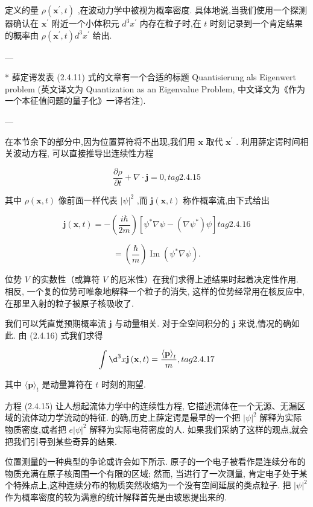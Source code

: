 \documentclass[lang=cn,newtx,10pt,scheme=chinese,thmcnt=section]{elegantbook}
\begin{document}
定义的量 $\rho \left( {{\mathbf{x}}^{\prime }, t}\right)$ ,在波动力学中被视为概率密度. 具体地说,当我们使用一个探测器确认在 ${\mathbf{x}}^{\prime }$ 附近一个小体积元 ${d}^{3}{x}^{\prime }$ 内存在粒子时,在 $t$ 时刻记录到一个肯定结果的概率由 $\rho \left( {{\mathbf{x}}^{\prime }, t}\right) {d}^{3}{x}^{\prime }$ 给出.

---

* 薛定谔发表 (2.4.11) 式的文章有一个合适的标题 Quantisierung als Eigenwert problem (英文译文为 Quantization as an Eigenvalue Problem, 中文译文为《作为一个本征值问题的量子化》一译者注).

---

在本节余下的部分中,因为位置算符将不出现,我们用 $\mathbf{x}$ 取代 ${\mathbf{x}}^{\prime }$ . 利用薛定谔时间相关波动方程, 可以直接推导出连续性方程

$$
\frac{\partial \rho }{\partial t} + \nabla \cdot \mathbf{j} = 0, tag{2.4.15}
$$

其中 $\rho \left( {\mathbf{x}, t}\right)$ 像前面一样代表 ${\left| \psi \right| }^{2}$ ,而 $\mathbf{j}\left( {\mathbf{x}, t}\right)$ 称作概率流,由下式给出

$$
\mathbf{j}\left( {\mathbf{x}, t}\right) = - \left( \frac{i\hbar }{2m}\right) \left\lbrack {{\psi }^{ * }\nabla \psi - \left( {\nabla {\psi }^{ * }}\right) \psi }\right\rbrack tag{2. 4.16}
$$

$$
= \left( \frac{\hbar }{m}\right) \operatorname{Im}\left( {{\psi }^{ * }\nabla \psi }\right) .
$$

位势 $V$ 的实数性（或算符 $V$ 的厄米性）在我们求得上述结果时起着决定性作用. 相反, 一个复的位势可唯象地解释一个粒子的消失, 这样的位势经常用在核反应中, 在那里入射的粒子被原子核吸收了.

我们可以凭直觉预期概率流 $\mathbf{j}$ 与动量相关. 对于全空间积分的 $\mathbf{j}$ 来说,情况的确如此. 由 (2.4.16) 式我们求得

$$
\int {\d}^{3}x\mathbf{j}\left( {\mathbf{x}, t}\right) = \frac{\langle \mathbf{p}{\rangle }_{t}}{m}, tag{2.4.17}
$$

其中 $\langle \mathbf{p}{\rangle }_{t}$ 是动量算符在 $t$ 时刻的期望.

方程 (2.4.15) 让人想起流体力学中的连续性方程, 它描述流体在一个无源、无漏区域的流体动力学流动的特征. 的确,历史上薛定谔是最早的一个把 ${\left| \psi \right| }^{2}$ 解释为实际物质密度,或者把 $e{\left| \psi \right| }^{2}$ 解释为实际电荷密度的人. 如果我们采纳了这样的观点,就会把我们引导到某些奇异的结果.

位置测量的一种典型的争论或许会如下所示. 原子的一个电子被看作是连续分布的物质充满在原子核周围一个有限的区域; 然而, 当进行了一次测量, 肯定电子处于某个特殊点上,这种连续分布的物质突然收缩为一个没有空间延展的类点粒子. 把 ${\left| \psi \right| }^{2}$ 作为概率密度的较为满意的统计解释首先是由玻恩提出来的.
\end{document}
